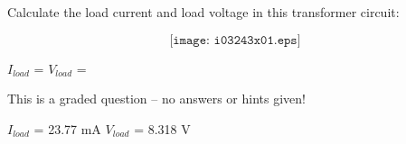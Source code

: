 

Calculate the load current and load voltage in this transformer circuit:

$$\texttt{[image: i03243x01.eps]}$$

\vskip 10pt

$I_{load}$ = \hskip 100pt $V_{load}$ =

\vfil 

\eject






This is a graded question -- no answers or hints given!
 






$I_{load}$ = 23.77 mA \hskip 80pt $V_{load}$ = 8.318 V




